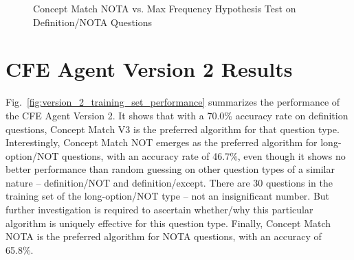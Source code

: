 \begin{figure}
\centering
\vspace{0.75in}
\caption{Concept Match NOTA vs. Max Frequency Hypothesis Test on Definition/NOTA  Questions}
\label{fig:concept_match_nota_hypothesis_test}
\end{figure}





\section{CFE Agent Version 2 Results}

Fig.~\ref{fig:version_2_training_set_performance} summarizes the performance of the CFE Agent Version 2.  It shows that with a 70.0\% accuracy rate on definition questions, Concept Match V3 is the preferred algorithm for that question type.  Interestingly, Concept Match NOT emerges as the preferred algorithm for long-option/NOT questions, with an accuracy rate of 46.7\%, even though it shows no better performance than random guessing on other question types of a similar nature -- definition/NOT  and definition/except.  There are 30 questions in the training set of the long-option/NOT type -- not an insignificant number.  But further investigation is required to ascertain whether/why this particular algorithm is uniquely effective for this question type.  Finally, Concept Match NOTA is the preferred algorithm for NOTA questions, with an accuracy of 65.8\%.


